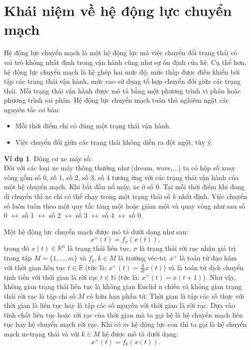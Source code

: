 \documentclass[14pt,a4paper,oneside]{report}		%
\theoremstyle{definition}
\newtheorem{example}[theorem]{Ví dụ}
\begin{document}
\section{Khái niệm về hệ động lực chuyển mạch}
Hệ động lực chuyển mạch là một hệ động lực mà việc chuyển đổi trạng thái có vai trò không nhất định trong vận hành cũng như sự ổn định của hệ. Cụ thể hơn, hệ động lực chuyển mạch là hệ ghép hai mức độ, mức thấp được điều khiển bởi tập các trạng thái vận hành, mức cao sử dụng tổ hợp chuyển đổi giữa các trạng thái. Mỗi trạng thái vận hành được mô tả bằng một phương trình vi phân hoặc phương trình sai phân. Hệ động lực chuyển mạch tuân thủ nghiêm ngặt các nguyên tắc cơ bản:
\begin{itemize}
  \item Mỗi thời điểm chỉ có đúng một trạng thái vận hành.
  \item Việc chuyển đổi giữa các trạng thái không diễn ra đột ngột, tùy ý.
\end{itemize}
\begin{example}
Động cơ xe máy số:\\
Đối với các loại xe máy thông thường như (dream, wave,...) ta có hộp số xoay vòng gồm số 0, số 1, số 2, số 3, số 4 tương ứng với các trạng thái vận hành của một hệ chuyển mạch. Khi bắt đầu nổ máy, xe ở số 0. Tại mỗi thời điểm khi đang di chuyển thì xe chỉ có thể chạy trong một trạng thái số $k$ nhất định. Việc chuyển số luôn tuân theo một quy tắc tăng một hoặc giảm một và quay vòng như sau số 0 $\leftrightarrow$ số 1 $\leftrightarrow$ số 2 $\leftrightarrow$ số 3 $\leftrightarrow$ số 4 $\leftrightarrow$ số 0.
\end{example}

Một hệ động lực chuyển mạch được mô tả dưới dạng như sau:
\begin{equation} \label{eq1-1}
x^+(t) = f_\sigma(x(t)),
\end{equation}
trong đó $x(t)\in\mathbb{R}^n$ là trạng thái liên tục, $\sigma$ là trạng thái rời rạc nhận giá trị trong tập $M = \{1,...,m\}$ và $f_k, k\in M$ là trường véc-tơ. $x^+$ là toán tử đạo hàm với thời gian liên tục $t\in\mathbb{R}$ (tức là: $x^+(t)=\frac{d}{dt}x(t)$) và là toán tử dịch chuyển tịnh tiến với thời gian là rời rạc $t\in\mathbb{N}$ (tức là: $x^+(t)=x(t+1)$). Như vậy, không gian trạng thái liên tục là không gian Euclid n chiều và không gian trạng thái rời rạc là tập chỉ số $M$ có hữu hạn phần tử. Thời gian là tập các số thực với thời gian là liên tục hay là tập các số nguyên với thời gian là rời rạc. Dựa vào tính chất liên tục hoặc rời rạc của thời gian mà ta gọi hệ là hệ chuyển mạch liên tục hay hệ chuyển mạch rời rạc. Khi có $m$ hệ động lực con thì ta gọi là hệ chuyển mạch m-trạng thái và với $k\in M$ hệ được mô tả dưới dạng:
\begin{equation} \label{eq1-2}
x^+(t) = f_k(x(t)).
\end{equation}
\end{document}
